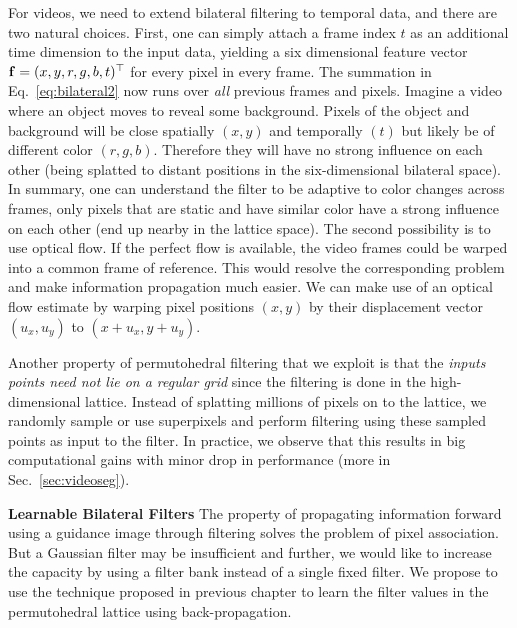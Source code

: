 For videos, we need to extend bilateral filtering to temporal data, and there are two natural choices.
First, one can simply attach a frame index $t$ as an additional time dimension to the input data, yielding a six dimensional feature vector $\mathbf{f}=(x,y,r,g,b,t)^{\top}$ for every pixel in every frame.
The summation in Eq.~\ref{eq:bilateral2} now runs over \emph{all} previous frames and pixels.
Imagine a video where an object moves to reveal some background.
Pixels of the object and background will be close spatially $(x,y)$ and temporally $(t)$ but likely be of different color $(r,g,b)$.
Therefore they will have no strong influence on each other (being splatted to distant positions in the six-dimensional bilateral space).
In summary, one can understand the filter to be adaptive to color changes across frames, only pixels that are static and have similar color have a strong influence on each other (end up nearby in the lattice space).
The second possibility is to use optical flow. If the perfect flow is available, the video frames could be warped into a common frame of reference. This would resolve the corresponding problem and make information propagation much easier.
We can make use of an optical flow estimate by warping pixel positions $(x,y)$ by their displacement vector $(u_x,u_y)$ to $(x+u_x,y+u_y)$.

Another property of permutohedral filtering that we exploit
is that the \emph{inputs points need not lie on a regular grid} since the filtering
is done in the high-dimensional lattice. Instead of splatting millions of pixels on to the
lattice, we randomly sample or use superpixels and perform filtering using these sampled
points as input to the filter. In practice, we observe that this results in big computational
gains with minor drop in performance (more in Sec.~\ref{sec:videoseg}).

{\bf Learnable Bilateral Filters} The property of propagating information forward using a guidance image through filtering solves the problem of pixel association.
But a Gaussian filter may be insufficient and further, we would like to increase the capacity by using a filter bank instead of a single fixed filter.
We propose to use the technique proposed in previous chapter
to learn the filter values in the permutohedral lattice using back-propagation.

